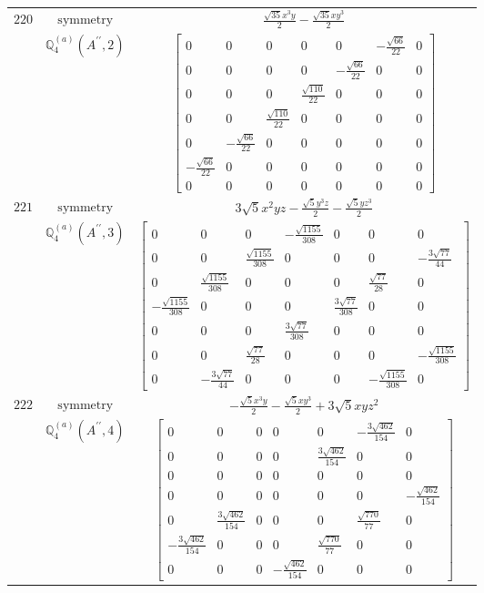 \documentclass[fleqn,8pt,landscape]{jsarticle}
\begin{document}
\begin{longtable}{ccc}
$ 220 $ & $ \text{symmetry} $ & $ \frac{\sqrt{35} x^{3} y}{2} - \frac{\sqrt{35} x y^{3}}{2} $ \\
$  $ & $ \mathbb{Q}_{4}^{(a)}(A^{\prime\prime},2) $ & $ \begin{bmatrix} 0 & 0 & 0 & 0 & 0 & - \frac{\sqrt{66}}{22} & 0 \\ 0 & 0 & 0 & 0 & - \frac{\sqrt{66}}{22} & 0 & 0 \\ 0 & 0 & 0 & \frac{\sqrt{110}}{22} & 0 & 0 & 0 \\ 0 & 0 & \frac{\sqrt{110}}{22} & 0 & 0 & 0 & 0 \\ 0 & - \frac{\sqrt{66}}{22} & 0 & 0 & 0 & 0 & 0 \\ - \frac{\sqrt{66}}{22} & 0 & 0 & 0 & 0 & 0 & 0 \\ 0 & 0 & 0 & 0 & 0 & 0 & 0 \end{bmatrix} $ \\ \hline
$ 221 $ & $ \text{symmetry} $ & $ 3 \sqrt{5} x^{2} y z - \frac{\sqrt{5} y^{3} z}{2} - \frac{\sqrt{5} y z^{3}}{2} $ \\
$  $ & $ \mathbb{Q}_{4}^{(a)}(A^{\prime\prime},3) $ & $ \begin{bmatrix} 0 & 0 & 0 & - \frac{\sqrt{1155}}{308} & 0 & 0 & 0 \\ 0 & 0 & \frac{\sqrt{1155}}{308} & 0 & 0 & 0 & - \frac{3 \sqrt{77}}{44} \\ 0 & \frac{\sqrt{1155}}{308} & 0 & 0 & 0 & \frac{\sqrt{77}}{28} & 0 \\ - \frac{\sqrt{1155}}{308} & 0 & 0 & 0 & \frac{3 \sqrt{77}}{308} & 0 & 0 \\ 0 & 0 & 0 & \frac{3 \sqrt{77}}{308} & 0 & 0 & 0 \\ 0 & 0 & \frac{\sqrt{77}}{28} & 0 & 0 & 0 & - \frac{\sqrt{1155}}{308} \\ 0 & - \frac{3 \sqrt{77}}{44} & 0 & 0 & 0 & - \frac{\sqrt{1155}}{308} & 0 \end{bmatrix} $ \\ \hline
$ 222 $ & $ \text{symmetry} $ & $ - \frac{\sqrt{5} x^{3} y}{2} - \frac{\sqrt{5} x y^{3}}{2} + 3 \sqrt{5} x y z^{2} $ \\
$  $ & $ \mathbb{Q}_{4}^{(a)}(A^{\prime\prime},4) $ & $ \begin{bmatrix} 0 & 0 & 0 & 0 & 0 & - \frac{3 \sqrt{462}}{154} & 0 \\ 0 & 0 & 0 & 0 & \frac{3 \sqrt{462}}{154} & 0 & 0 \\ 0 & 0 & 0 & 0 & 0 & 0 & 0 \\ 0 & 0 & 0 & 0 & 0 & 0 & - \frac{\sqrt{462}}{154} \\ 0 & \frac{3 \sqrt{462}}{154} & 0 & 0 & 0 & \frac{\sqrt{770}}{77} & 0 \\ - \frac{3 \sqrt{462}}{154} & 0 & 0 & 0 & \frac{\sqrt{770}}{77} & 0 & 0 \\ 0 & 0 & 0 & - \frac{\sqrt{462}}{154} & 0 & 0 & 0 \end{bmatrix} $ \\ \hline

\end{longtable}
\end{document}
